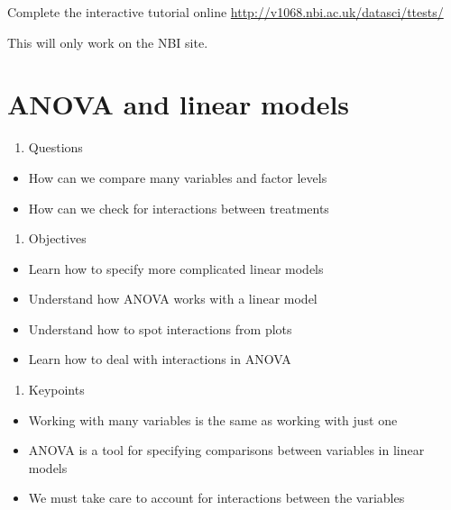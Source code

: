 \documentclass[
]{book}
\providecommand{\tightlist}{%
  \setlength{\itemsep}{0pt}\setlength{\parskip}{0pt}}
\newenvironment{task}
{ \begin{tcolorbox}[title=For you to do,title filled] }
{  \end{tcolorbox} }
\begin{document}
\begin{task}
Complete the interactive tutorial online \url{http://v1068.nbi.ac.uk/datasci/ttests/}

This will only work on the NBI site.
\end{task}

\hypertarget{anova-and-linear-models}{%
\chapter{ANOVA and linear models}\label{anova-and-linear-models}}

\begin{enumerate}
\def\labelenumi{\arabic{enumi}.}
\tightlist
\item
  Questions
\end{enumerate}

\begin{itemize}
\tightlist
\item
  How can we compare many variables and factor levels
\item
  How can we check for interactions between treatments
\end{itemize}

\begin{enumerate}
\def\labelenumi{\arabic{enumi}.}
\setcounter{enumi}{1}
\tightlist
\item
  Objectives
\end{enumerate}

\begin{itemize}
\tightlist
\item
  Learn how to specify more complicated linear models
\item
  Understand how ANOVA works with a linear model
\item
  Understand how to spot interactions from plots
\item
  Learn how to deal with interactions in ANOVA
\end{itemize}

\begin{enumerate}
\def\labelenumi{\arabic{enumi}.}
\setcounter{enumi}{2}
\tightlist
\item
  Keypoints
\end{enumerate}

\begin{itemize}
\tightlist
\item
  Working with many variables is the same as working with just one
\item
  ANOVA is a tool for specifying comparisons between variables in linear models
\item
  We must take care to account for interactions between the variables
\end{itemize}
\end{document}
